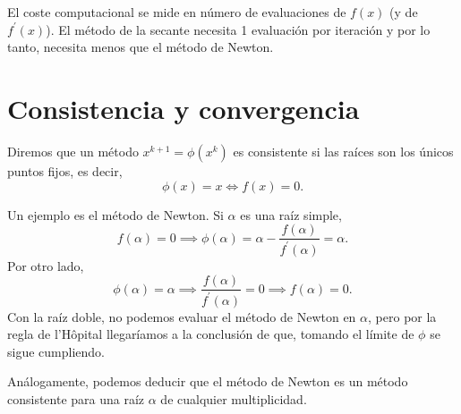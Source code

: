 \begin{center}
\end{center}

\begin{obs}
    El coste computacional se mide en número de evaluaciones de $f(x)$ (y de $f^\prime(x)$).
    El método de la secante necesita 1 evaluación por iteración y por lo tanto, necesita menos que
    el método de Newton.
\end{obs}

\section{Consistencia y convergencia}

\begin{defi}
    Diremos que un método $x^{k+1} = \phi\left( x^k \right)$ es consistente si las raíces son
    los únicos puntos fijos, es decir,
    \[
        \phi(x) = x \iff f(x) = 0.
    \]
\end{defi}

\begin{ej}
    Un ejemplo es el método de Newton. Si $\alpha$ es una raíz simple,
    \[
        f(\alpha) = 0 \implies \phi(\alpha) = \alpha - \frac{f(\alpha)}{f^\prime(\alpha)} = \alpha.
    \]
    Por otro lado,
    \[
        \phi(\alpha) = \alpha \implies \frac{f(\alpha)}{f^\prime(\alpha)} = 0 \implies f(\alpha) = 0.
    \]
    Con la raíz doble, no podemos evaluar el método de Newton en $\alpha$, pero por la regla de l'Hôpital llegaríamos
    a la conclusión de que, tomando el límite de $\phi$ se sigue cumpliendo.

    Análogamente, podemos deducir que el método de Newton es un método consistente para una raíz $\alpha$ de
    cualquier multiplicidad.
\end{ej}

